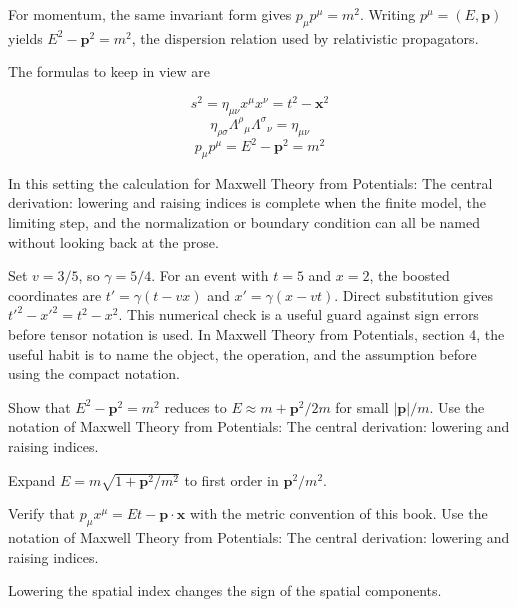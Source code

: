 For momentum, the same invariant form gives \(p_\mu p^\mu=m^2\).  Writing \(p^\mu=(E,\bm p)\) yields \(E^2-\bm p^2=m^2\), the dispersion relation used by relativistic propagators.

The formulas to keep in view are

\[
  s^2=\eta_{\mu\nu}x^\mu x^\nu=t^2-\bm x^2
\]
\[
  \eta_{\rho\sigma}\Lambda^\rho{}_\mu\Lambda^\sigma{}_\nu=\eta_{\mu\nu}
\]
\[
  p_\mu p^\mu=E^2-\bm p^2=m^2
\]

In this setting the calculation for Maxwell Theory from Potentials: The central derivation: lowering and raising indices is complete when the finite model, the limiting step, and the normalization or boundary condition can all be named without looking back at the prose.




\begin{example}
Set \(v=3/5\), so \(\gamma=5/4\).  For an event with \(t=5\) and \(x=2\), the boosted coordinates are \(t'=\gamma(t-vx)\) and \(x'=\gamma(x-vt)\).  Direct substitution gives \(t'^2-x'^2=t^2-x^2\).  This numerical check is a useful guard against sign errors before tensor notation is used.  In Maxwell Theory from Potentials, section 4, the useful habit is to name the object, the operation, and the assumption before using the compact notation.
\end{example}



\begin{exercise}
Show that \(E^2-\bm p^2=m^2\) reduces to \(E\approx m+\bm p^2/2m\) for small \(|\bm p|/m\).  Use the notation of Maxwell Theory from Potentials: The central derivation: lowering and raising indices.
\begin{answer}
Expand \(E=m\sqrt{1+\bm p^2/m^2}\) to first order in \(\bm p^2/m^2\).
\end{answer}
\end{exercise}

\begin{exercise}
Verify that \(p_\mu x^\mu=Et-\bm p\cdot\bm x\) with the metric convention of this book.  Use the notation of Maxwell Theory from Potentials: The central derivation: lowering and raising indices.
\begin{answer}
Lowering the spatial index changes the sign of the spatial components.
\end{answer}
\end{exercise}



